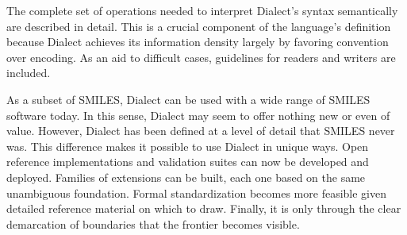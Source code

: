 \documentclass{article}
\begin{document}
The complete set of operations needed to interpret Dialect's syntax semantically are described in detail. This is a crucial component of the language's definition because Dialect achieves its information density largely by favoring convention over encoding. As an aid to difficult cases, guidelines for readers and writers are included.

As a subset of SMILES, Dialect can be used with a wide range of SMILES software today. In this sense, Dialect may seem to offer nothing new or even of value. However, Dialect has been defined at a level of detail that SMILES never was. This difference makes it possible to use Dialect in unique ways. Open reference implementations and validation suites can now be developed and deployed. Families of extensions can be built, each one based on the same unambiguous foundation. Formal standardization becomes more feasible given detailed reference material on which to draw. Finally, it is only through the clear demarcation of boundaries that the frontier becomes visible.

\clearpage
\printbibliography
\end{document}
